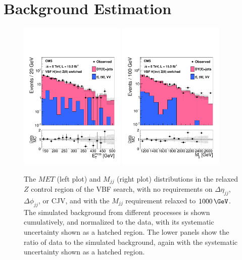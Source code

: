 \section{Background Estimation}


\begin{figure}[!htb]
\centering
\includegraphics[width=0.45\textwidth]{Chapter05/Images/ZCtrlMET.pdf}
\includegraphics[width=0.45\textwidth]{Chapter05/Images/ZCtrlMjj.pdf}   
\caption{The $MET$ (left plot) and $M_{jj}$ (right plot) distributions in the relaxed $Z$ control region of the \gls{VBF} search, with no requirements on $\Delta\eta_{jj}$, $\Delta\phi_{jj}$, or \gls{CJV}, and with the $M_{jj}$ requirement relaxed to $1000\,\GeV$.  The simulated background from different processes is shown cumulatively, and normalized to the data, with its systematic uncertainty shown as a hatched region.  The lower panels show the ratio of data to the simulated background, again with the systematic uncertainty shown as a hatched region. \cite{ARTICLE:CMSVBFHiggsToInvAndZHCombination}}
\label{fig:zCtrl}
\end{figure}

